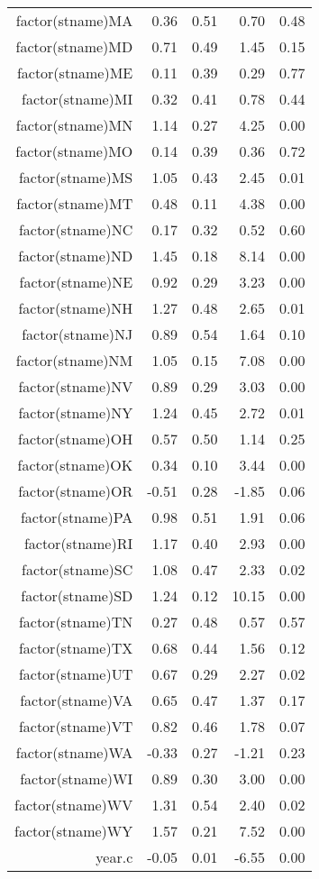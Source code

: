 \begin{table}[ht]
\begin{tabular}{rrrrr}
  factor(stname)MA & 0.36 & 0.51 & 0.70 & 0.48 \\ 
  factor(stname)MD & 0.71 & 0.49 & 1.45 & 0.15 \\ 
  factor(stname)ME & 0.11 & 0.39 & 0.29 & 0.77 \\ 
  factor(stname)MI & 0.32 & 0.41 & 0.78 & 0.44 \\ 
  factor(stname)MN & 1.14 & 0.27 & 4.25 & 0.00 \\ 
  factor(stname)MO & 0.14 & 0.39 & 0.36 & 0.72 \\ 
  factor(stname)MS & 1.05 & 0.43 & 2.45 & 0.01 \\ 
  factor(stname)MT & 0.48 & 0.11 & 4.38 & 0.00 \\ 
  factor(stname)NC & 0.17 & 0.32 & 0.52 & 0.60 \\ 
  factor(stname)ND & 1.45 & 0.18 & 8.14 & 0.00 \\ 
  factor(stname)NE & 0.92 & 0.29 & 3.23 & 0.00 \\ 
  factor(stname)NH & 1.27 & 0.48 & 2.65 & 0.01 \\ 
  factor(stname)NJ & 0.89 & 0.54 & 1.64 & 0.10 \\ 
  factor(stname)NM & 1.05 & 0.15 & 7.08 & 0.00 \\ 
  factor(stname)NV & 0.89 & 0.29 & 3.03 & 0.00 \\ 
  factor(stname)NY & 1.24 & 0.45 & 2.72 & 0.01 \\ 
  factor(stname)OH & 0.57 & 0.50 & 1.14 & 0.25 \\ 
  factor(stname)OK & 0.34 & 0.10 & 3.44 & 0.00 \\ 
  factor(stname)OR & -0.51 & 0.28 & -1.85 & 0.06 \\ 
  factor(stname)PA & 0.98 & 0.51 & 1.91 & 0.06 \\ 
  factor(stname)RI & 1.17 & 0.40 & 2.93 & 0.00 \\ 
  factor(stname)SC & 1.08 & 0.47 & 2.33 & 0.02 \\ 
  factor(stname)SD & 1.24 & 0.12 & 10.15 & 0.00 \\ 
  factor(stname)TN & 0.27 & 0.48 & 0.57 & 0.57 \\ 
  factor(stname)TX & 0.68 & 0.44 & 1.56 & 0.12 \\ 
  factor(stname)UT & 0.67 & 0.29 & 2.27 & 0.02 \\ 
  factor(stname)VA & 0.65 & 0.47 & 1.37 & 0.17 \\ 
  factor(stname)VT & 0.82 & 0.46 & 1.78 & 0.07 \\ 
  factor(stname)WA & -0.33 & 0.27 & -1.21 & 0.23 \\ 
  factor(stname)WI & 0.89 & 0.30 & 3.00 & 0.00 \\ 
  factor(stname)WV & 1.31 & 0.54 & 2.40 & 0.02 \\ 
  factor(stname)WY & 1.57 & 0.21 & 7.52 & 0.00 \\ 
  year.c & -0.05 & 0.01 & -6.55 & 0.00 \\ 
   \hline
\end{tabular}
\end{table}
